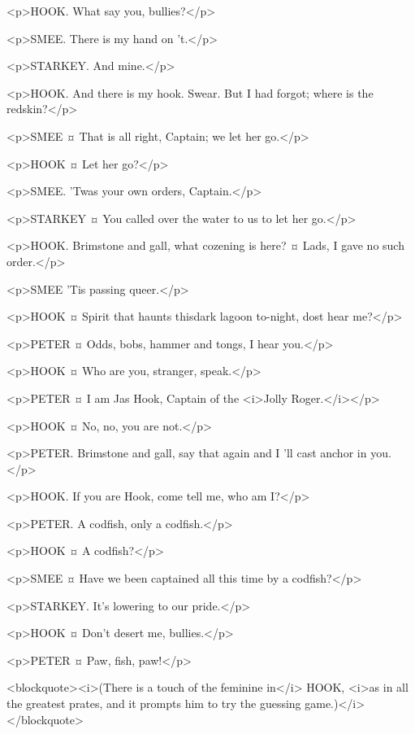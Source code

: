 <p>HOOK. What say you, bullies?</p>

<p>SMEE. There is my hand on 't.</p>

<p>STARKEY. And mine.</p>

<p>HOOK. And there is my hook. Swear.
But I had forgot; where is the redskin?</p>

<p>SMEE ¤
That is all right, Captain; we let her go.</p>

<p>HOOK ¤
Let her go?</p>

<p>SMEE. 'Twas your own orders, Captain.</p>

<p>STARKEY ¤
You called over the water to us to let her go.</p>

<p>HOOK. Brimstone and gall, what cozening is here?
¤
Lads, I gave no such order.</p>

<p>SMEE 'Tis passing queer.</p>

<p>HOOK ¤
Spirit that haunts thisdark lagoon to-night, dost hear me?</p>

<p>PETER ¤
Odds, bobs, hammer and tongs, I hear you.</p>

<p>HOOK ¤
Who are you, stranger, speak.</p>

<p>PETER ¤
I am Jas Hook, Captain of the <i>Jolly Roger.</i></p>

<p>HOOK ¤
No, no, you are not.</p>

<p>PETER. Brimstone and gall, say that again and I 'll cast anchor in you.</p>

<p>HOOK. If you are Hook, come tell me, who am I?</p>

<p>PETER. A codfish, only a codfish.</p>

<p>HOOK ¤
A codfish?</p>

<p>SMEE ¤
Have we been captained all this time by a codfish?</p>

<p>STARKEY. It's lowering to our pride.</p>

<p>HOOK ¤
Don't desert me, bullies.</p>

<p>PETER ¤
Paw, fish, paw!</p>

<blockquote><i>(There is a touch of the feminine in</i> HOOK, <i>as in all the greatest prates, and it prompts him to try the guessing game.)</i></blockquote>

